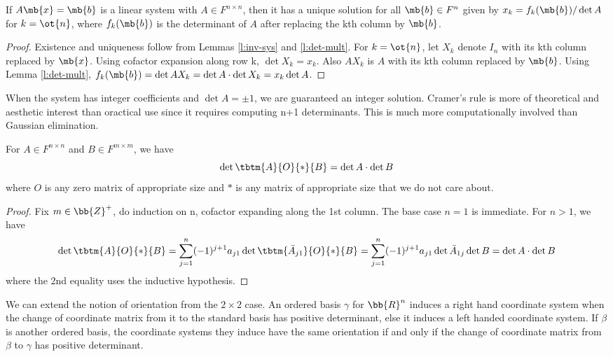 \begin{lem}
If $A \mb{x}= \mb{b}$ is a linear system with $A \in F^{n \times n}$, then it has a unique solution for all $\mb{b}\in F^n$ given by $x_k=f_k( \mb{b})/ \det A$ for $k= \ot{n}$, where $f_k( \mb{b})$ is the determinant of $A$ after replacing the kth column by $\mb{b}$.
\end{lem}
\begin{proof}%
Existence and uniqueness follow from Lemmas \ref{l:inv-sys} and \ref{l:det-mult}. For $k= \ot{n}$, let $X_k$ denote $I_n$ with its kth column replaced by $\mb{x}$.
Using cofactor expansion along row k, $\det X_k=x_k$.
Also $AX_k$ is $A$ with its kth column replaced by $\mb{b}$. Using Lemma \ref{l:det-mult}, $f_k( \mb{b})= \det AX_k= \det A \cdot \det X_k= x_k \det A$.
\end{proof}
When the system has integer coefficients and $\det A= \pm 1$, we are guaranteed an integer solution. Cramer's rule is more of theoretical and aesthetic interest than oractical use since it requires computing n+1 determinants. This is much more computationally involved than Gaussian elimination.
\begin{exer}\label{e:block-det}
For $A \in F^{n \times n}$ and $B \in F^{m \times m}$, we have
\[ \det \tbtm{A}{O}{*}{B}= \det A \cdot \det B \]
where $O$ is any zero matrix of appropriate size and $*$ is any matrix of appropriate size that we do not care about.
\end{exer}
\begin{proof}
Fix $m \in \bb{Z}^+$, do induction on n, cofactor expanding along the 1st column. The base case $n=1$ is immediate. For $n>1$, we have
\[ \det \tbtm{A}{O}{*}{B}= \sum_{j=1}^n(-1)^{j+1}a_{j1}\det \tbtm{\bar{A}_{j1}}{O}{*}{B}= \sum_{j=1}^n(-1)^{j+1}a_{j1}\det \bar{A}_{1j} \det B= \det A \cdot \det B \]
where the 2nd equality uses the inductive hypothesis.
\end{proof}
We can extend the notion of orientation from the $2 \times 2$ case. An ordered basis $\gamma$ for $\bb{R}^n$ induces a right hand coordinate system when the change of coordinate matrix from it to the standard basis has positive determinant, else it induces a left handed coordinate system.
If $\beta$ is another ordered basis, the coordinate systems they induce have the same orientation if and only if the change of coordinate matrix from $\beta$ to $\gamma$ has positive determinant.

